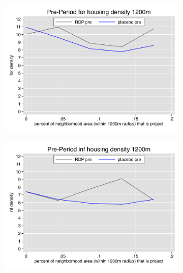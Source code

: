 \documentclass[12pt]{article}
\begin{document}
\pagebreak





\begin{figure}
        \begin{subfigure}[b]{0.495\textwidth}
            \centering
            \includegraphics[width=\textwidth,trim={0.3cm .3cm 0.1cm 0cm}, clip=true]{figures/overlap_for_1200_total_pre.pdf}
        \end{subfigure}
        \hfill
        \begin{subfigure}[b]{0.495\textwidth}  
            \centering 
            \includegraphics[width=\textwidth,trim={0.3cm .3cm 0.1cm 0cm}, clip=true]{figures/overlap_inf_1200_total_pre.pdf}

\end{subfigure}
\end{figure}
\end{document}
